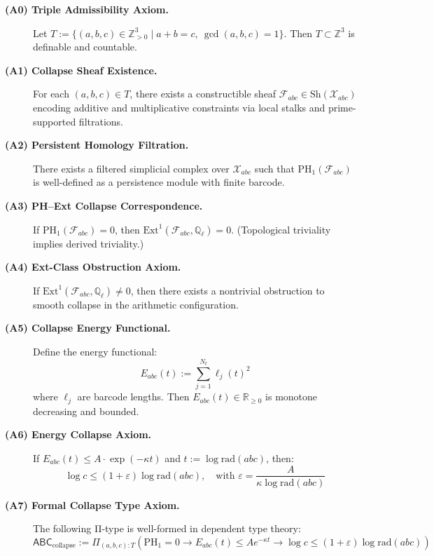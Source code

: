 \documentclass[11pt]{article}
\begin{document}
\begin{description}

  \item[\textbf{(A0) Triple Admissibility Axiom.}]  
  Let \( T := \{ (a,b,c) \in \mathbb{Z}_{>0}^3 \mid a + b = c,\ \gcd(a,b,c)=1 \} \).  
  Then \( T \subset \mathbb{Z}^3 \) is definable and countable.

  \item[\textbf{(A1) Collapse Sheaf Existence.}]  
  For each \( (a,b,c) \in T \), there exists a constructible sheaf \( \mathcal{F}_{abc} \in \mathrm{Sh}(\mathcal{X}_{abc}) \)  
  encoding additive and multiplicative constraints via local stalks and prime-supported filtrations.

  \item[\textbf{(A2) Persistent Homology Filtration.}]  
  There exists a filtered simplicial complex over \( \mathcal{X}_{abc} \) such that  
  \( \mathrm{PH}_1(\mathcal{F}_{abc}) \) is well-defined as a persistence module with finite barcode.

  \item[\textbf{(A3) PH–Ext Collapse Correspondence.}]  
  If \( \mathrm{PH}_1(\mathcal{F}_{abc}) = 0 \), then \( \mathrm{Ext}^1(\mathcal{F}_{abc}, \mathbb{Q}_\ell) = 0 \).  
  (Topological triviality implies derived triviality.)

  \item[\textbf{(A4) Ext-Class Obstruction Axiom.}]  
  If \( \mathrm{Ext}^1(\mathcal{F}_{abc}, \mathbb{Q}_\ell) \neq 0 \), then  
  there exists a nontrivial obstruction to smooth collapse in the arithmetic configuration.

  \item[\textbf{(A5) Collapse Energy Functional.}]  
  Define the energy functional:
  \[
  E_{abc}(t) := \sum_{j=1}^{N_t} \ell_j(t)^2
  \]
  where \( \ell_j \) are barcode lengths. Then \( E_{abc}(t) \in \mathbb{R}_{\geq 0} \) is monotone decreasing and bounded.

  \item[\textbf{(A6) Energy Collapse Axiom.}]  
  If \( E_{abc}(t) \leq A \cdot \exp(-\kappa t) \) and \( t := \log \mathrm{rad}(abc) \), then:
  \[
  \log c \leq (1 + \varepsilon) \log \mathrm{rad}(abc), \quad \text{with } \varepsilon = \frac{A}{\kappa \log \mathrm{rad}(abc)}
  \]

  \item[\textbf{(A7) Formal Collapse Type Axiom.}]  
  The following Π-type is well-formed in dependent type theory:
  \[
  \mathsf{ABC}_{\text{collapse}} := \Pi_{(a,b,c):T} \left( \mathrm{PH}_1 = 0 \to E_{abc}(t) \leq A e^{-\kappa t} \to \log c \leq (1+\varepsilon) \log \mathrm{rad}(abc) \right)
  \]


\end{description}
\end{document}

